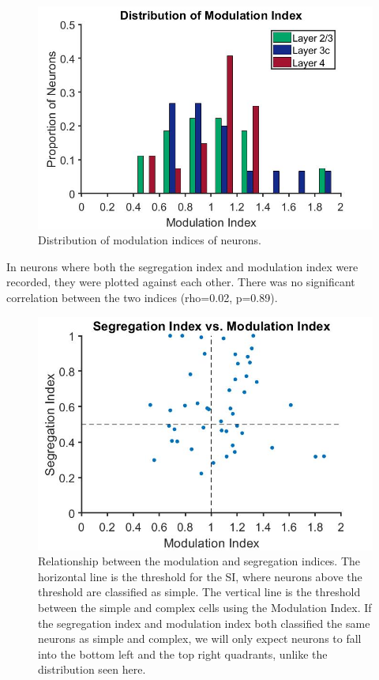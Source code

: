 		\begin{figure}[H]
		
		\includegraphics[width=\linewidth]{LinearV1/modind_layer_colour.jpg}
		\caption{Distribution of modulation indices of neurons.}
		\label{fig:fig4}
	\end{figure}
	In neurons where both the segregation index and modulation index were recorded, they were plotted against each other. There was no significant correlation between the two indices (rho=0.02, p=0.89). 
	
	
	\begin{figure}[H]
		
		\includegraphics[width=\linewidth]{LinearV1/Segindvsmodind.jpg}
		\caption{Relationship between the modulation and segregation indices. The horizontal line is the threshold for the SI, where neurons above the threshold are classified as simple. The vertical line is the threshold between the simple and complex cells using the Modulation Index. If the segregation index and modulation index both classified the same neurons as simple and complex, we will only expect neurons to fall into the bottom left and the top right quadrants, unlike the distribution seen here.}
		\label{fig:fig5}
	\end{figure}

